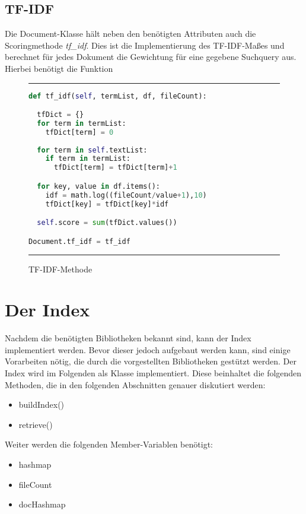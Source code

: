 \subsection{TF-IDF}\label{tf-idf}

Die Document-Klasse hält neben den benötigten Attributen auch die Scoringmethode \textit{tf\_idf}. Dies ist die Implementierung des TF-IDF-Maßes und berechnet für jedes Dokument die Gewichtung für eine gegebene Suchquery aus. Hierbei benötigt die Funktion

\begin{figure}[h]
	\rule{\textwidth}{0.4pt}
		\begin{lstlisting}[language=Python]
def tf_idf(self, termList, df, fileCount):

  tfDict = {}
  for term in termList:
    tfDict[term] = 0  
  
  for term in self.textList:
    if term in termList:
      tfDict[term] = tfDict[term]+1

  for key, value in df.items():
    idf = math.log((fileCount/value+1),10)
    tfDict[key] = tfDict[key]*idf

  self.score = sum(tfDict.values())

Document.tf_idf = tf_idf
		\end{lstlisting}
	\rule{\textwidth}{0.4pt}
	\caption{TF-IDF-Methode}
	\label{fig:tfidf}
\end{figure}

\section{Der Index}\label{der-index}

Nachdem die benötigten Bibliotheken bekannt sind, kann der Index implementiert werden. Bevor dieser jedoch aufgebaut werden kann, sind einige Vorarbeiten nötig, die durch die vorgestellten Bibliotheken gestützt werden. Der Index wird im Folgenden als Klasse implementiert. Diese beinhaltet die folgenden Methoden, die in den folgenden Abschnitten genauer diskutiert werden:

\begin{itemize}
	\item buildIndex()
	\item retrieve()
\end{itemize}

Weiter werden die folgenden Member-Variablen benötigt:

\begin{itemize}
	\item hashmap
	\item fileCount
	\item docHashmap
\end{itemize}

